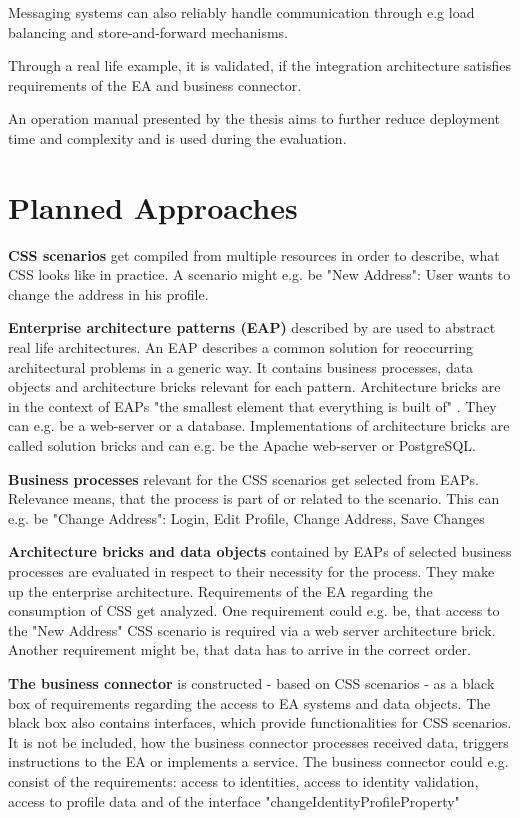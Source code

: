 \documentclass{article}
\begin{document}
Messaging systems can also reliably handle communication through e.g load balancing and store-and-forward mechanisms.

Through a real life example, it is validated, if the integration architecture satisfies requirements of the EA and 
business connector.

An operation manual presented by the thesis aims to further reduce deployment time and complexity and is used during the evaluation.

\section{Planned Approaches}

\textbf{CSS scenarios} get compiled from multiple resources in order to describe, what CSS looks like in practice.
A scenario might e.g. be "New Address": User wants to change the address in his profile.

\textbf{Enterprise architecture patterns (EAP)} described by \textcite{architecturePatterns} are used to abstract
real life architectures. An EAP describes a common solution for reoccurring architectural problems in a 
generic way. It contains business processes, data objects and architecture bricks relevant for each pattern.
Architecture bricks are in the context of EAPs "the smallest element that everything is built of" 
\cite[Page 21]{architecturePatterns}. They can e.g. be a web-server or a database. Implementations of 
architecture bricks are called solution bricks and can e.g. be the Apache web-server or PostgreSQL.

\textbf{Business processes} relevant for the CSS scenarios get selected from EAPs. Relevance means, that the process 
is part of or related to the scenario.
This can e.g. be "Change Address": Login, Edit Profile, Change Address, Save Changes

\textbf{Architecture bricks and data objects} contained by EAPs of selected business processes are evaluated in respect to their necessity 
for the process. They make up the enterprise architecture. Requirements of the EA 
regarding the consumption of CSS get analyzed. One requirement could e.g. be, that access to 
the "New Address" CSS scenario is required via a web server architecture brick. Another requirement might be, 
that data has to arrive in the correct order.

\textbf{The business connector} is constructed - based on CSS scenarios - as a black box of requirements regarding 
the access to EA systems and data objects. The black box also contains interfaces, which provide functionalities for CSS 
scenarios. It is not be included, how the business 
connector processes received data, triggers instructions to the EA or implements a service.
The business connector could e.g. consist of the requirements: access to identities, access to identity validation, 
access to profile data and of the interface "changeIdentityProfileProperty"
\end{document}
